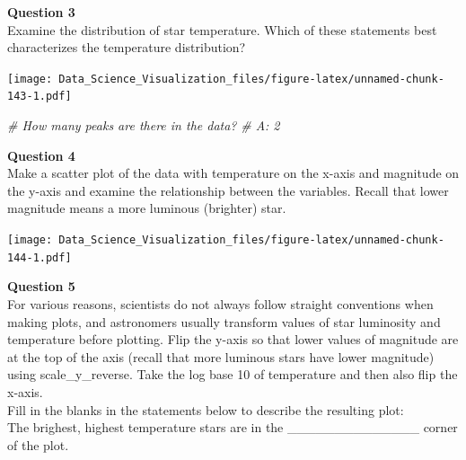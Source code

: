 \documentclass[
]{article}
\newenvironment{Shaded}{\begin{snugshade}}{\end{snugshade}}
\newcommand{\CommentTok}[1]{\textcolor[rgb]{0.56,0.35,0.01}{\textit{#1}}}
\newcommand{\DataTypeTok}[1]{\textcolor[rgb]{0.13,0.29,0.53}{#1}}
\newcommand{\KeywordTok}[1]{\textcolor[rgb]{0.13,0.29,0.53}{\textbf{#1}}}
\newcommand{\NormalTok}[1]{#1}
\newcommand{\OperatorTok}[1]{\textcolor[rgb]{0.81,0.36,0.00}{\textbf{#1}}}
\newcommand{\StringTok}[1]{\textcolor[rgb]{0.31,0.60,0.02}{#1}}
\begin{document}
\textbf{Question 3}\\
Examine the distribution of star temperature. Which of these statements
best characterizes the temperature distribution?

\begin{Shaded}
\end{Shaded}

\texttt{[image: Data\_Science\_Visualization\_files/figure-latex/unnamed-chunk-143-1.pdf]}

\begin{Shaded}
\begin{Highlighting}[]
\CommentTok{# How many peaks are there in the data?}
\CommentTok{# A: 2}
\end{Highlighting}
\end{Shaded}

\textbf{Question 4}\\
Make a scatter plot of the data with temperature on the x-axis and
magnitude on the y-axis and examine the relationship between the
variables. Recall that lower magnitude means a more luminous (brighter)
star.

\begin{Shaded}
\end{Shaded}

\texttt{[image: Data\_Science\_Visualization\_files/figure-latex/unnamed-chunk-144-1.pdf]}

\textbf{Question 5}\\
For various reasons, scientists do not always follow straight
conventions when making plots, and astronomers usually transform values
of star luminosity and temperature before plotting. Flip the y-axis so
that lower values of magnitude are at the top of the axis (recall that
more luminous stars have lower magnitude) using scale\_y\_reverse. Take
the log base 10 of temperature and then also flip the x-axis.\\
Fill in the blanks in the statements below to describe the resulting
plot:\\
The brighest, highest temperature stars are in the
\_\_\_\_\_\_\_\_\_\_\_\_\_\_ corner of the plot.
\end{document}
